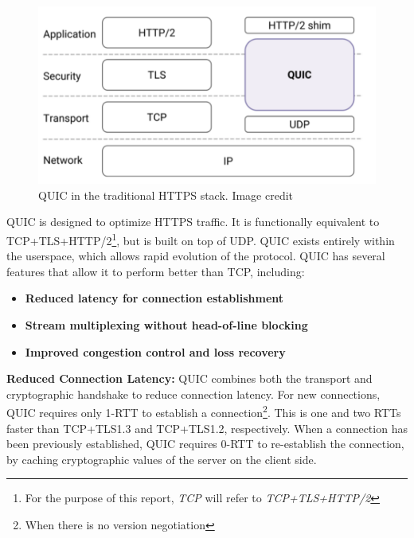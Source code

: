 \documentclass[12pt]{article}
\begin{document}
\begin{figure}
\centering
\includegraphics[scale=.25]{images/quic_stack.png}
\caption{QUIC in the traditional HTTPS stack. Image credit \cite{Langley:2017:QTP:3098822.3098842}}
\label{fig:quic_stack}
\end{figure}

QUIC is designed to optimize HTTPS traffic. It is functionally equivalent to TCP+TLS+HTTP/2\footnote{For the purpose of this report, \emph{TCP} will refer to \emph{TCP+TLS+HTTP/2}}, but is built on top of UDP. QUIC exists entirely within the userspace, which allows rapid evolution of the protocol. QUIC has several features that allow it to perform better than TCP, including:
\begin{itemize}
	\item \textbf{Reduced latency for connection establishment}
	\item \textbf{Stream multiplexing without head-of-line blocking}
	\item \textbf{Improved congestion control and loss recovery}
\end{itemize}

\textbf{Reduced Connection Latency:} QUIC combines both the transport and cryptographic handshake to reduce connection latency. For new connections, QUIC requires only 1-RTT to establish a connection\footnote{When there is no version negotiation}. This is one and two RTTs faster than TCP+TLS1.3 and TCP+TLS1.2, respectively\cite{7867726}. When a connection has been previously established, QUIC requires 0-RTT to re-establish the connection, by caching cryptographic values of the server on the client side.
\end{document}

